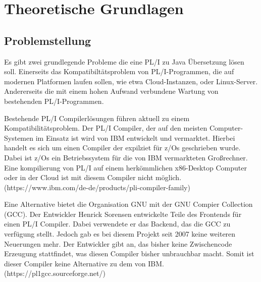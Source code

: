 




\section{Theoretische Grundlagen}
\subsection{Problemstellung}
	
Es gibt zwei grundlegende Probleme die eine PL/I zu Java Übersetzung lösen soll. 
Einerseits das Kompatibiltätsproblem von PL/I-Programmen, die auf modernen Platformen laufen sollen, wie etwa Cloud-Instanzen, oder Linux-Server. Andererseits die mit einem hohen Aufwand verbundene Wartung von bestehenden PL/I-Programmen. 
	
Bestehende PL/I Compilerlösungen führen aktuell zu einem Kompatibilitätsproblem. Der PL/I Compiler, der auf den meisten Computer-Systemen im Einsatz ist wird von IBM entwickelt und vermarktet. Hierbei handelt es sich um einen Compiler der expilziet für z/Os geschrieben wurde. Dabei ist z/Os ein Betriebssystem für die von IBM vermarkteten Großrechner. Eine kompilierung von PL/I auf einem herkömmlichen x86-Desktop Computer oder in der Cloud ist mit diesem Compiler nicht möglich. 
(https://www.ibm.com/de-de/products/pli-compiler-family) 

Eine Alternative bietet die Organisation GNU mit der GNU Compier Collection (GCC). Der Entwickler Henrick Sorensen entwickelte Teile des Frontends für einen PL/I Compiler. Dabei verwendete er das Backend, das die GCC zu verfügung stellt. Jedoch gab es bei diesem Projekt seit 2007 keine weiteren Neuerungen mehr. Der Entwickler gibt an, das bisher keine Zwischencode Erzeugung stattfindet, was diesen Compiler bisher unbrauchbar macht. Somit ist dieser Compiler keine Alternative zu dem von IBM.
(https://pl1gcc.sourceforge.net/) 

